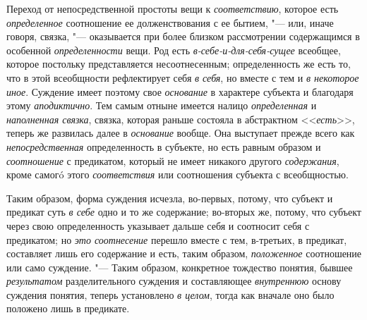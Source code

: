 {{Переход от непосредственной простоты вещи к
{\em соответствию},
которое есть
{\em определенное}
соотношение ее долженствования с ее бытием, "---
или, иначе говоря, связка, "--- оказывается при
более близком рассмотрении содержащимся в особенной
{\em определенности}
вещи. Род есть
{\em в-себе-и-для-себя-сущее}
всеобщее, которое постольку представляется несоотнесенным;
определенность же есть то, что в этой всеобщности рефлектирует себя
{\em в себя}, но вместе с
тем и {\em в некоторое иное}.
Суждение имеет поэтому свое
{\em основание} в
характере субъекта и благодаря этому
{\em аподиктично}. Тем
самым отныне имеется налицо
{\em определенная} и
{\em наполненная связка},
связка, которая раньше состояла в абстрактном
<<{\em есть}>>, теперь же
развилась далее в {\em основание}
вообще. Она выступает прежде всего как
{\em непосредственная}
определенность в субъекте, но есть равным образом и
{\em соотношение} с
предикатом, который не имеет никакого другого
{\em содержания}, кроме
самогó этого {\em соответствия}
или соотношения субъекта с всеобщностью.

Таким образом, форма суждения исчезла, во-первых, потому, что
субъект и предикат суть {\em в себе}
одно и то же содержание; во-вторых же, потому, что субъект
через свою определенность указывает дальше себя и соотносит себя с
предикатом; но {\em это соотнесение}
перешло вместе с тем, в-третьих, в предикат, составляет лишь
его содержание и есть, таким образом,
{\em положенное}
соотношение или само суждение. "--- Таким
образом, конкретное тождество понятия, бывшее
{\em результатом}
разделительного суждения и составляющее
{\em внутреннюю} основу
суждения понятия, теперь установлено
{\em в целом}, тогда как
вначале оно было положено лишь в предикате.

}}
